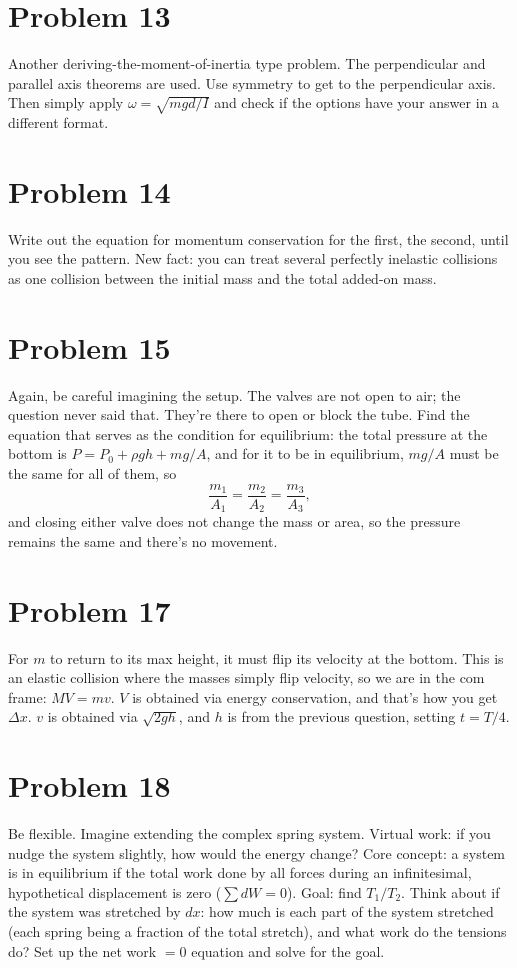 \documentclass[11pt]{article}
\begin{document}
\section*{Problem 13}
Another deriving-the-moment-of-inertia type problem. The perpendicular and parallel axis theorems are used. Use symmetry to get to the perpendicular axis.
Then simply apply $\omega=\sqrt{mgd/I}$ and check if the options have your answer in a different format.

\section*{Problem 14}
Write out the equation for momentum conservation for the first, the second, until you see the pattern.
New fact: you can treat several perfectly inelastic collisions as one collision between the initial mass and the total added-on mass.

\section*{Problem 15}
Again, be careful imagining the setup. The valves are not open to air; the question never said that. They're there to open or block the tube.
Find the equation that serves as the condition for equilibrium: the total pressure at the bottom is $P=P_0+\rho gh+mg/A$, and for it to be in equilibrium, $mg/A$ must be the same for all of them, so
\[
\frac{m_1}{A_1}=\frac{m_2}{A_2}=\frac{m_3}{A_3},
\]
and closing either valve does not change the mass or area, so the pressure remains the same and there's no movement.

\section*{Problem 17}
For $m$ to return to its max height, it must flip its velocity at the bottom. This is an elastic collision where the masses simply flip velocity, so we are in the com frame: $MV=mv$.
$V$ is obtained via energy conservation, and that's how you get $\Delta x$.
$v$ is obtained via $\sqrt{2gh}$, and $h$ is from the previous question, setting $t=T/4$.

\section*{Problem 18}
Be flexible. Imagine extending the complex spring system.
Virtual work: if you nudge the system slightly, how would the energy change? Core concept: a system is in equilibrium if the total work done by all forces during an infinitesimal, hypothetical displacement is zero ($\sum dW=0$).
Goal: find $T_1/T_2$. Think about if the system was stretched by $dx$: how much is each part of the system stretched (each spring being a fraction of the total stretch), and what work do the tensions do? Set up the net work $=0$ equation and solve for the goal.
\end{document}
